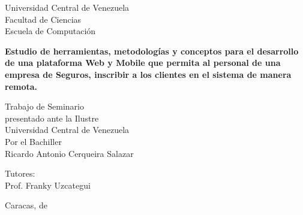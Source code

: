 \begin{center}
	Universidad Central de Venezuela\\
	Facultad de Ciencias\\
	Escuela de Computación\\
	
\end{center}

\vspace{2.5cm}
\begin{center}
	\large{\textbf{Estudio de herramientas, metodologías y conceptos para el desarrollo de una plataforma Web y Mobile que permita al personal de una empresa de Seguros, inscribir a los clientes en el sistema de manera remota. }}
\end{center}

\vspace{6.0cm}
\begin{center}
	Trabajo de Seminario \\
	presentado ante la Ilustre\\
	Universidad Central de Venezuela\\
	Por el Bachiller\\
	Ricardo Antonio Cerqueira Salazar\\
\end{center}

\begin{center}
	Tutores:\\ Prof. Franky Uzcategui\\
\end{center}

\vspace{1.0cm}
\begin{center}
	Caracas, \monthname[\month] de \the\year
\end{center}